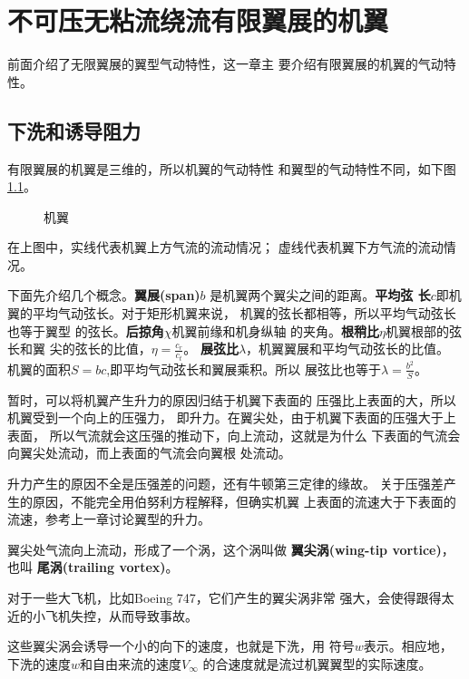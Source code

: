 \chapter{不可压无粘流绕流有限翼展的机翼}
前面介绍了无限翼展的翼型气动特性，这一章主
要介绍有限翼展的机翼的气动特性。
\section{下洗和诱导阻力}
有限翼展的机翼是三维的，所以机翼的气动特性
和翼型的气动特性不同，如下图\ref{fig:span}。
\begin{figure}[!ht]
  \centering 
  
  \caption{机翼}
  \label{fig:span}
\end{figure}
在上图中，实线代表机翼上方气流的流动情况；
虚线代表机翼下方气流的流动情况。

下面先介绍几个概念。{\bfseries 翼展(span)}$b$
是机翼两个翼尖之间的距离。{\bfseries 平均弦
长}$c$即机翼的平均气动弦长。对于矩形机翼来说，
机翼的弦长都相等，所以平均气动弦长也等于翼型
的弦长。{\bfseries 后掠角}$\chi$机翼前缘和机身纵轴
的夹角。{\bfseries 根稍比}$\eta$机翼根部的弦长和翼
尖的弦长的比值，$\eta=\frac{c_r}{c_t}$。{\bfseries 
展弦比}$\lambda$，机翼翼展和平均气动弦长的比值。
机翼的面积$S=bc$,即平均气动弦长和翼展乘积。所以
展弦比也等于$\lambda=\frac{b^2}{S}$。

暂时，可以将机翼产生升力的原因归结于机翼下表面的
压强比上表面的大，所以机翼受到一个向上的压强力，
即升力。在翼尖处，由于机翼下表面的压强大于上表面，
所以气流就会这压强的推动下，向上流动，这就是为什么
下表面的气流会向翼尖处流动，而上表面的气流会向翼根
处流动。
\begin{note}
升力产生的原因不全是压强差的问题，还有牛顿第三定律的缘故。
关于压强差产生的原因，不能完全用伯努利方程解释，但确实机翼
上表面的流速大于下表面的流速，参考上一章讨论翼型的升力。
\end{note}
翼尖处气流向上流动，形成了一个涡，这个涡叫做
{\bfseries 翼尖涡(wing-tip vortice)}，也叫
{\bfseries 尾涡(trailing vortex)}。
\begin{note}
对于一些大飞机，比如Boeing 747，它们产生的翼尖涡非常
强大，会使得跟得太近的小飞机失控，从而导致事故。
\end{note}
这些翼尖涡会诱导一个小的向下的速度，也就是下洗，用
符号$w$表示。相应地，下洗的速度$w$和自由来流的速度$V_\infty$
的合速度就是流过机翼翼型的实际速度。

